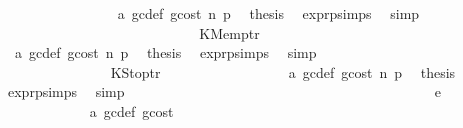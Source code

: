 \begin{isabellebody}
\ \ \ \ \ \ \ \ \ \ \ \ \ \ \isamarkupfalse%
\ {}{}{\isacharparenleft}{\kern0pt}{}{\isacharparenright}{\kern0pt}\ a{}\ gc{\isacharunderscore}{\kern0pt}def\ gcost\ n\ p{}\ \isamarkupfalse%
\ {\isacharquery}{\kern0pt}thesis\ \isamarkupfalse%
\ expr{\isachardot}{\kern0pt}psimps{\isacharparenleft}{\kern0pt}{}{}{\isacharparenright}{\kern0pt}\ \isamarkupfalse%
\ simp\isanewline
\ \ \ \ \ \ \ \ \ \ \ \ \isamarkupfalse%
\isanewline
\ \ \ \ \ \ \ \ \ \ \ \ \ \ \isamarkupfalse%
\ {\isacharparenleft}{\kern0pt}KMemptr\ {\isacharunderscore}{\kern0pt}{\isacharparenright}{\kern0pt}\isanewline
\ \ \ \ \ \ \ \ \ \ \ \ \ \ \isamarkupfalse%
\ {}{}{\isacharparenleft}{\kern0pt}{}{\isacharparenright}{\kern0pt}\ a{}\ gc{\isacharunderscore}{\kern0pt}def\ gcost\ n\ p{}\ \isamarkupfalse%
\ {\isacharquery}{\kern0pt}thesis\ \isamarkupfalse%
\ expr{\isachardot}{\kern0pt}psimps{\isacharparenleft}{\kern0pt}{}{}{\isacharparenright}{\kern0pt}\ \isamarkupfalse%
\ simp\isanewline
\ \ \ \ \ \ \ \ \ \ \ \ \isamarkupfalse%
\isanewline
\ \ \ \ \ \ \ \ \ \ \ \ \ \ \isamarkupfalse%
\ {\isacharparenleft}{\kern0pt}KStoptr\ {\isacharunderscore}{\kern0pt}{\isacharparenright}{\kern0pt}\isanewline
\ \ \ \ \ \ \ \ \ \ \ \ \ \ \isamarkupfalse%
\ {}{}{\isacharparenleft}{\kern0pt}{}{\isacharparenright}{\kern0pt}\ a{}\ gc{\isacharunderscore}{\kern0pt}def\ gcost\ n\ p{}\ \isamarkupfalse%
\ {\isacharquery}{\kern0pt}thesis\ \isamarkupfalse%
\ expr{\isachardot}{\kern0pt}psimps{\isacharparenleft}{\kern0pt}{}{}{\isacharparenright}{\kern0pt}\ \isamarkupfalse%
\ simp\isanewline
\ \ \ \ \ \ \ \ \ \ \ \ \isamarkupfalse%
\isanewline
\ \ \ \ \ \ \ \ \ \ \isamarkupfalse%
\isanewline
\ \ \ \ \ \ \ \ \isamarkupfalse%
\isanewline
\ \ \ \ \ \ \ \ \ \ \isamarkupfalse%
\ {\isacharparenleft}{\kern0pt}e\ {\isacharunderscore}{\kern0pt}{\isacharparenright}{\kern0pt}\isanewline
\ \ \ \ \ \ \ \ \ \ \isamarkupfalse%
\ {}{}{\isacharparenleft}{\kern0pt}{}{\isacharparenright}{\kern0pt}\ a{}\ gc{\isacharunderscore}{\kern0pt}def\ gcost\ \isamarkupfalse%

\end{isabellebody}
